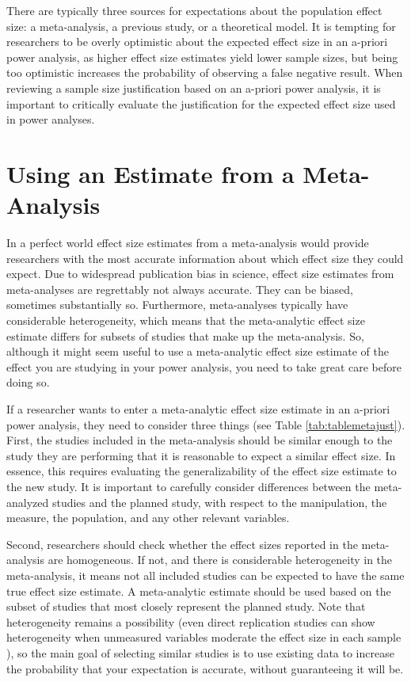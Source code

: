 \documentclass[
]{krantz}
\begin{document}
There are typically three sources for expectations about the population effect size: a meta-analysis, a previous study, or a theoretical model. It is tempting for researchers to be overly optimistic about the expected effect size in an a-priori power analysis, as higher effect size estimates yield lower sample sizes, but being too optimistic increases the probability of observing a false negative result. When reviewing a sample size justification based on an a-priori power analysis, it is important to critically evaluate the justification for the expected effect size used in power analyses.

\hypertarget{using-an-estimate-from-a-meta-analysis}{%
\section{Using an Estimate from a Meta-Analysis}\label{using-an-estimate-from-a-meta-analysis}}

In a perfect world effect size estimates from a meta-analysis would provide researchers with the most accurate information about which effect size they could expect. Due to widespread publication bias in science, effect size estimates from meta-analyses are regrettably not always accurate. They can be biased, sometimes substantially so. Furthermore, meta-analyses typically have considerable heterogeneity, which means that the meta-analytic effect size estimate differs for subsets of studies that make up the meta-analysis. So, although it might seem useful to use a meta-analytic effect size estimate of the effect you are studying in your power analysis, you need to take great care before doing so.

If a researcher wants to enter a meta-analytic effect size estimate in an a-priori power analysis, they need to consider three things (see Table \ref{tab:tablemetajust}). First, the studies included in the meta-analysis should be similar enough to the study they are performing that it is reasonable to expect a similar effect size. In essence, this requires evaluating the generalizability of the effect size estimate to the new study. It is important to carefully consider differences between the meta-analyzed studies and the planned study, with respect to the manipulation, the measure, the population, and any other relevant variables.

Second, researchers should check whether the effect sizes reported in the meta-analysis are homogeneous. If not, and there is considerable heterogeneity in the meta-analysis, it means not all included studies can be expected to have the same true effect size estimate. A meta-analytic estimate should be used based on the subset of studies that most closely represent the planned study. Note that heterogeneity remains a possibility (even direct replication studies can show heterogeneity when unmeasured variables moderate the effect size in each sample \citep{kenny_unappreciated_2019, olsson-collentine_heterogeneity_2020}), so the main goal of selecting similar studies is to use existing data to increase the probability that your expectation is accurate, without guaranteeing it will be.
\end{document}
